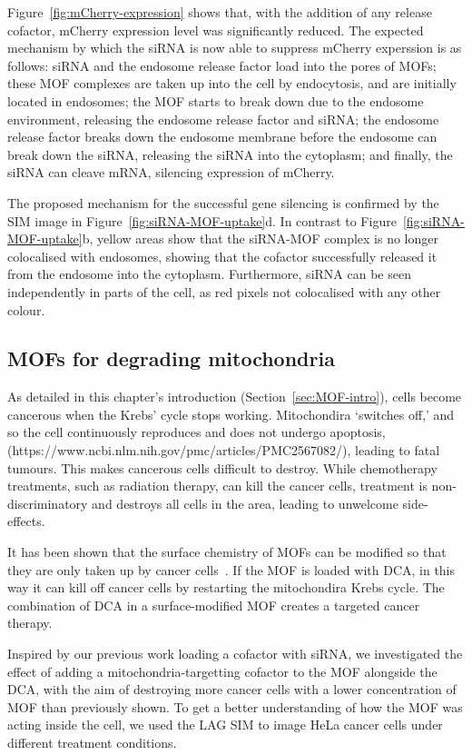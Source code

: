 Figure~\ref{fig:mCherry-expression} shows that, with the addition of any release cofactor, mCherry expression level was significantly reduced. 
The expected mechanism by which the siRNA is now able to suppress mCherry experssion is as follows: siRNA and the endosome release factor load into the pores of MOFs; these MOF complexes are taken up into the cell by endocytosis, and are initially located in endosomes; the MOF starts to break down due to the endosome environment, releasing the endosome release factor and siRNA; the endosome release factor breaks down the endosome membrane before the endosome can break down the siRNA, releasing the siRNA into the cytoplasm; and finally, the siRNA can cleave mRNA, silencing expression of mCherry.

The proposed mechanism for the successful gene silencing is confirmed by the SIM image in Figure~\ref{fig:siRNA-MOF-uptake}d. 
In contrast to Figure~\ref{fig:siRNA-MOF-uptake}b, yellow areas show that the siRNA-MOF complex is no longer colocalised with endosomes, showing that the cofactor successfully released it from the endosome into the cytoplasm. 
Furthermore, siRNA can be seen independently in parts of the cell, as red pixels not colocalised with any other colour. 

\subsection{MOFs for degrading mitochondria}
As detailed in this chapter's introduction (Section~\ref{sec:MOF-intro}), cells become cancerous when the Krebs' cycle stops working. 
Mitochondira `switches off,' and so the cell continuously reproduces and does not undergo apoptosis, (https://www.ncbi.nlm.nih.gov/pmc/articles/PMC2567082/), leading to fatal tumours. 
This makes cancerous cells difficult to destroy. 
While chemotherapy treatments, such as radiation therapy, can kill the cancer cells, treatment is non-discriminatory and destroys all cells in the area, leading to unwelcome side-effects. 

It has been shown that the surface chemistry of MOFs can be modified so that they are only taken up by cancer cells~\cite{abanades2018mechanistic}. 
If the MOF is loaded with DCA, in this way it can kill off cancer cells by restarting the mitochondira Krebs cycle. 
The combination of DCA in a surface-modified MOF creates a targeted cancer therapy. 

Inspired by our previous work loading a cofactor with siRNA, we investigated the effect of adding a mitochondria-targetting cofactor to the MOF alongside the DCA, with the aim of destroying more cancer cells with a lower concentration of MOF than previously shown. 
To get a better understanding of how the MOF was acting inside the cell, we used the LAG SIM to image HeLa cancer cells under different treatment conditions. 

